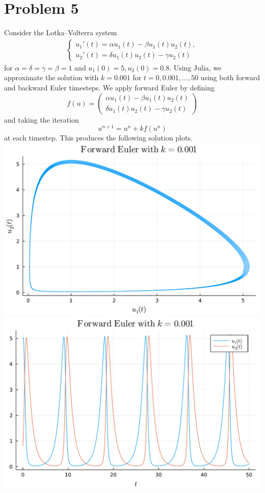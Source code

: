 \documentclass{article}
\begin{document}
\section{Problem 5}
Consider the Lotka--Volterra system
\begin{align*}
	\begin{cases}
		u_1'(t) = \alpha u_1(t) - \beta u_1(t) u_2(t),\\
		u_2'(t) = \delta u_1(t) u_2(t) - \gamma u_2(t)
	\end{cases}
\end{align*}
for $\alpha = \delta = \gamma = \beta = 1$ and $u_1(0) = 5, u_2(0) = 0.8$. Using Julia, we approximate the solution with $k = 0.001$ for $t = 0,0.001,\ldots,50$ using both forward and backward Euler timesteps. We apply forward Euler by defining $$
f(u) = \begin{pmatrix} \alpha u_1(t) - \beta u_1(t) u_2(t) \\ \delta u_1(t) u_2(t) - \gamma u_2(t) \end{pmatrix}
$$ and taking the iteration 
\[
u^{n+1}=u^n+kf(u^n)
\]
at each timestep. This produces the following solution plots.\\
\includegraphics[scale=0.5]{fe1.pdf}\\
\includegraphics[scale=0.5]{fe2.pdf}\\
\end{document}
